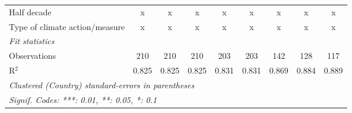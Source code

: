 \begin{tabular}{lcccccccc}
   Half decade                                                             & x             & x             & x             & x             & x             & x            & x            & x\\  
   Type of climate action/measure                                          & x             & x             & x             & x             & x             & x            & x            & x\\  
   \midrule \emph{Fit statistics}\\
   Observations                                                            & 210           & 210           & 210           & 203           & 203           & 142          & 128          & 117\\  
   R$^2$                                                                   & 0.825         & 0.825         & 0.825         & 0.831         & 0.831         & 0.869        & 0.884        & 0.889\\  
   \midrule
   \multicolumn{9}{l}{\emph{Clustered (Country) standard-errors in parentheses}}\\
   \multicolumn{9}{l}{\emph{Signif. Codes: ***: 0.01, **: 0.05, *: 0.1}}\\
\end{tabular}
\par\endgroup



